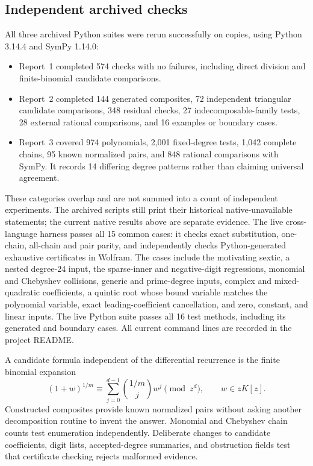 \documentclass[11pt,a4paper]{article}
\numberwithin{equation}{section}
\theoremstyle{definition}
\theoremstyle{remark}
\begin{document}
\subsection{Independent archived checks}
All three archived Python suites were rerun successfully on copies, using
Python 3.14.4 and SymPy 1.14.0:
\begin{itemize}
\item Report~1 completed 574 checks with no failures, including direct
division and finite-binomial candidate comparisons.
\item Report~2 completed 144 generated composites, 72 independent triangular
candidate comparisons, 348 residual checks, 27 indecomposable-family tests,
28 external rational comparisons, and 16 examples or boundary cases.
\item Report~3 covered 974 polynomials, 2,001 fixed-degree tests, 1,042 complete
chains, 95 known normalized pairs, and 848 rational comparisons with SymPy.
It records 14 differing degree patterns rather than claiming universal agreement.
\end{itemize}
These categories overlap and are not summed into a count of independent
experiments.  The archived scripts still print their historical
native-unavailable statements; the current native results above are separate
evidence.  The live cross-language harness passes all 15 common cases: it checks exact
substitution, one-chain, all-chain and pair parity, and independently checks
Python-generated exhaustive certificates in Wolfram. The cases include the
motivating sextic, a nested degree-24 input, the sparse-inner and negative-digit
regressions, monomial and Chebyshev collisions, generic and prime-degree inputs,
complex and mixed-quadratic coefficients, a quintic root whose bound variable
matches the polynomial variable, exact leading-coefficient cancellation, and
zero, constant, and linear inputs. The live Python suite passes all 16 test methods, including its generated and boundary cases. All current command lines are recorded in the project README.

A candidate formula independent of the differential recurrence is the finite
binomial expansion
\[
 (1+w)^{1/m}\equiv
 \sum_{j=0}^{d-1}\binom{1/m}{j}w^j\pmod{z^d},
 \qquad w\in zK[z].
\]
Constructed composites provide known normalized pairs without asking another
decomposition routine to invent the answer.  Monomial and Chebyshev chain
counts test enumeration independently.  Deliberate changes to candidate
coefficients, digit lists, accepted-degree summaries, and obstruction fields
test that certificate checking rejects malformed evidence.
\end{document}
